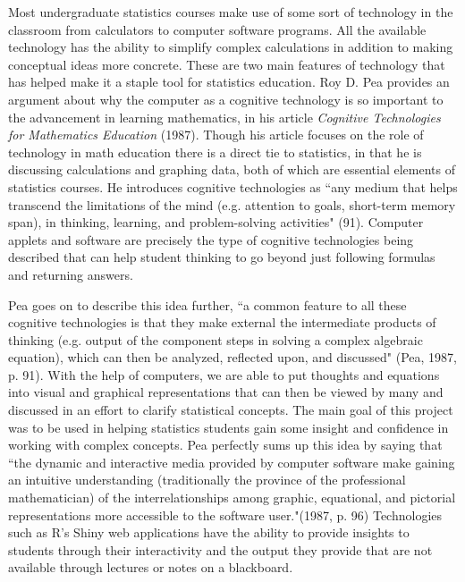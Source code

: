 \documentclass[11pt]{book}
\begin{document}
	Most undergraduate statistics courses make use of some sort of technology in the classroom from calculators to computer software programs.  All the available technology has the ability to simplify complex calculations in addition to making conceptual ideas more concrete.  These are two main features of technology that has helped make it a staple tool for statistics education.  Roy D. Pea provides an argument about why the computer as a cognitive technology is so important to the advancement in learning mathematics, in his article \emph{Cognitive Technologies for Mathematics Education} (1987).  Though his article focuses on the role of technology in math education there is a direct tie to statistics, in that he is discussing calculations and graphing data, both of which are essential elements of statistics courses.  He introduces cognitive technologies as ``any medium that helps transcend the limitations of the mind (e.g. attention to goals, short-term memory span), in thinking, learning, and problem-solving activities" (91). Computer applets and software are precisely the type of cognitive technologies being described that can help student thinking to go beyond just following formulas and returning answers.  
		
	  Pea goes on to describe this idea further,  ``a common feature to all these cognitive technologies is that they make external the intermediate products of thinking (e.g. output of the component steps in solving a complex algebraic equation), which can then be analyzed, reflected upon, and discussed" (Pea, 1987, p. 91).  With the help of computers, we are able to put thoughts and equations into visual and graphical representations that can then be viewed by many and discussed in an effort to clarify statistical concepts.  The main goal of this project was to be used in helping statistics students gain some insight and confidence in working with complex concepts.  Pea perfectly sums up this idea by saying that ``the dynamic and interactive media provided by computer software make gaining an intuitive understanding (traditionally the province of the professional mathematician) of the interrelationships among graphic, equational, and pictorial representations more accessible to the software user."(1987, p. 96)  Technologies such as R's Shiny web applications have the ability to provide insights to students through their interactivity and the output they provide that are not available through lectures or notes on a blackboard.
	 
\end{document}
